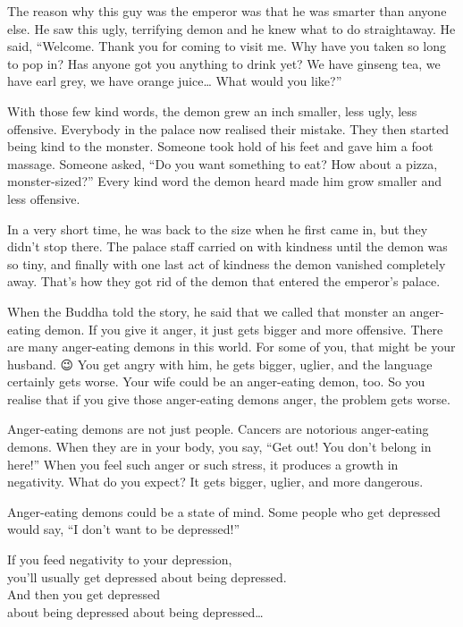 \documentclass[12pt, openany]{book}
\newenvironment{aphorism}%
{%
\begin{center}\begin{itshape}
}%
{\end{itshape}\end{center}
}%
\begin{document}
The reason why this guy was the emperor was that he was smarter than anyone else. He saw this ugly, terrifying demon and he knew what to do straightaway. He said, “Welcome. Thank you for coming to visit me. Why have you taken so long to pop in? Has anyone got you anything to drink yet? We have ginseng tea, we have earl grey, we have orange juice… What would you like?” 

With those few kind words, the demon grew an inch smaller, less ugly, less offensive. Everybody in the palace now realised their mistake. They then started being kind to the monster. Someone took hold of his feet and gave him a foot massage. Someone asked, “Do you want something to eat? How about a pizza, monster-sized?” Every kind word the demon heard made him grow smaller and less offensive. 

In a very short time, he was back to the size when he first came in, but they didn’t stop there. The palace staff carried on with kindness until the demon was so tiny, and finally with one last act of kindness the demon vanished completely away. That’s how they got rid of the demon that entered the emperor’s palace. 

When the Buddha told the story, he said that we called that monster an anger-eating demon. If you give it anger, it just gets bigger and more offensive. There are many anger-eating demons in this world. For some of you, that might be your husband. 😉 You get angry with him, he gets bigger, uglier, and the language certainly gets worse. Your wife could be an anger-eating demon, too. So you realise that if you give those anger-eating demons anger, the problem gets worse. 

Anger-eating demons are not just people. Cancers are notorious anger-eating demons. When they are in your body, you say, “Get out! You don’t belong in here!” When you feel such anger or such stress, it produces a growth in negativity. What do you expect? It gets bigger, uglier, and more dangerous. 

Anger-eating demons could be a state of mind. Some people who get depressed would say, “I don’t want to be depressed!” 

\begin{aphorism}
If you feed negativity to your depression,\\  
you’ll usually get depressed about being depressed. \\
And then you get depressed\\ 
about being depressed about being depressed…
\end{aphorism}
\end{document}

